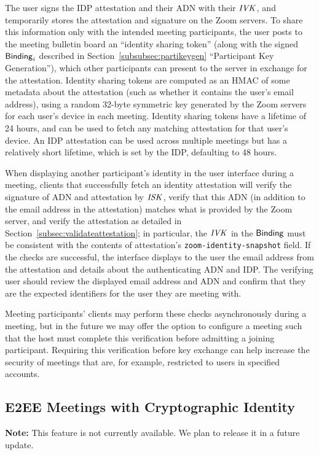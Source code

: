 The user signs the IDP attestation and their ADN with their $\mathit{IVK}$, and temporarily stores the
attestation and signature on the Zoom servers. To share this information only with the intended
meeting participants, the user posts to the meeting bulletin board an ``identity sharing token''
(along with the signed ${\sf Binding}_i$ described in Section~\ref{subsubsec:partikeygen} ``Participant
Key Generation''), which other participants can present to the server in exchange for the
attestation. Identity sharing tokens are computed as an HMAC of some metadata about the attestation
(such as whether it contains the user's email address), using a random 32-byte symmetric key
generated by the Zoom servers for each user's device in each meeting. Identity sharing tokens have a
lifetime of 24 hours, and can be used to fetch any matching attestation for that user's device.  An
IDP attestation can be used across multiple meetings but has a relatively short lifetime, which is
set by the IDP, defaulting to 48 hours.

When displaying another participant's identity in the user interface during a meeting, clients that
successfully fetch an identity attestation will verify the signature of ADN and attestation by
$\mathit{ISK}$, verify that this ADN (in addition to the email address in the attestation) matches what is
provided by the Zoom server, and verify the attestation as detailed in
Section~\ref{subsec:validateattestation}; in particular, the $\mathit{IVK}$ in the ${\sf Binding}$ must be
consistent with the contents of attestation's \texttt{zoom-identity-snapshot} field. If the checks
are successful, the interface displays to the user the email address from the attestation and
details about the authenticating ADN and IDP. The verifying user should review the displayed email
address and ADN and confirm that they are the expected identifiers for the user they are meeting
with.

Meeting participants' clients may perform these checks asynchronously during a meeting, but in the
future we may offer the option to configure a meeting such that the host must complete this
verification before admitting a joining participant. Requiring this verification before key exchange
can help increase the security of meetings that are, for example, restricted to users in specified
accounts. 

\subsection{E2EE Meetings with Cryptographic Identity}
\label{subsec:keyagreementidentity}
\textbf{Note:} This feature is not currently available. We plan to release it in a future update.

